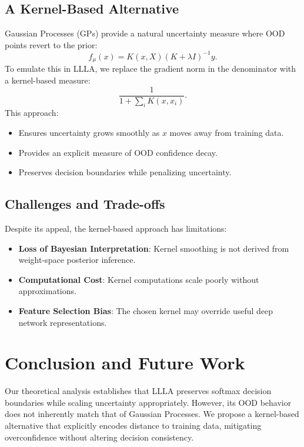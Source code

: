 \documentclass{article}
\begin{document}
\subsection{A Kernel-Based Alternative}
Gaussian Processes (GPs) provide a natural uncertainty measure where OOD points revert to the prior:
\begin{equation}
f_{\mu}(x) = K(x, X)(K + \lambda I)^{-1} y.
\end{equation}
To emulate this in LLLA, we replace the gradient norm in the denominator with a kernel-based measure:
\begin{equation}
\frac{1}{1 + \sum_{i} K(x, x_i)}.
\end{equation}
This approach:
\begin{itemize}
    \item Ensures uncertainty grows smoothly as \( x \) moves away from training data.
    \item Provides an explicit measure of OOD confidence decay.
    \item Preserves decision boundaries while penalizing uncertainty.
\end{itemize}

\subsection{Challenges and Trade-offs}
Despite its appeal, the kernel-based approach has limitations:
\begin{itemize}
    \item \textbf{Loss of Bayesian Interpretation}: Kernel smoothing is not derived from weight-space posterior inference.
    \item \textbf{Computational Cost}: Kernel computations scale poorly without approximations.
    \item \textbf{Feature Selection Bias}: The chosen kernel may override useful deep network representations.
\end{itemize}

\section{Conclusion and Future Work}
Our theoretical analysis establishes that LLLA preserves softmax decision boundaries while scaling uncertainty appropriately. However, its OOD behavior does not inherently match that of Gaussian Processes. We propose a kernel-based alternative that explicitly encodes distance to training data, mitigating overconfidence without altering decision consistency.
\end{document}

